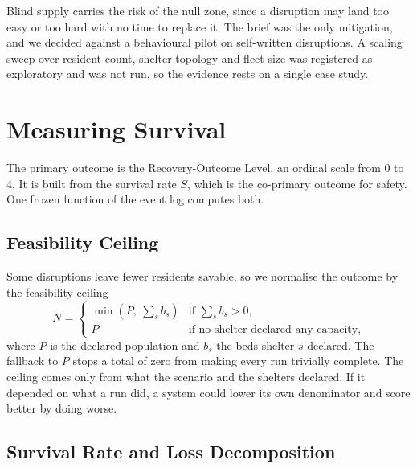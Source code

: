 Blind supply carries the risk of the null zone, since a disruption may land too
easy or too hard with no time to replace it. The brief was the only
mitigation, and we decided against a behavioural pilot on self-written
disruptions. A scaling sweep over resident count, shelter topology and fleet
size was registered as exploratory and was not run, so the evidence rests on a
single case study.

\section{Measuring Survival}
\label{sec:eval:primary}

The primary outcome is the Recovery-Outcome Level, an ordinal scale from 0 to 4.
It is built from the survival rate $S$, which is the co-primary outcome for
safety. One frozen function of the event log computes both.

\subsection{Feasibility Ceiling}
\label{sec:eval:ceiling}

Some disruptions leave fewer residents savable, so we normalise the outcome by
the feasibility ceiling
\begin{equation}
N =
\begin{cases}
\min\!\left(P,\ \sum_s b_s\right) & \text{if } \sum_s b_s > 0,\\[2pt]
P & \text{if no shelter declared any capacity,}
\end{cases}
\label{eq:eval:ceiling}
\end{equation}
where $P$ is the declared population and $b_s$ the beds shelter $s$ declared.
The fallback to $P$ stops a total of zero from making every run trivially
complete. The ceiling comes only from what the scenario and the shelters
declared. If it depended on what a run did, a system could lower its own
denominator and score better by doing worse.

\subsection{Survival Rate and Loss Decomposition}
\label{sec:eval:survival}

